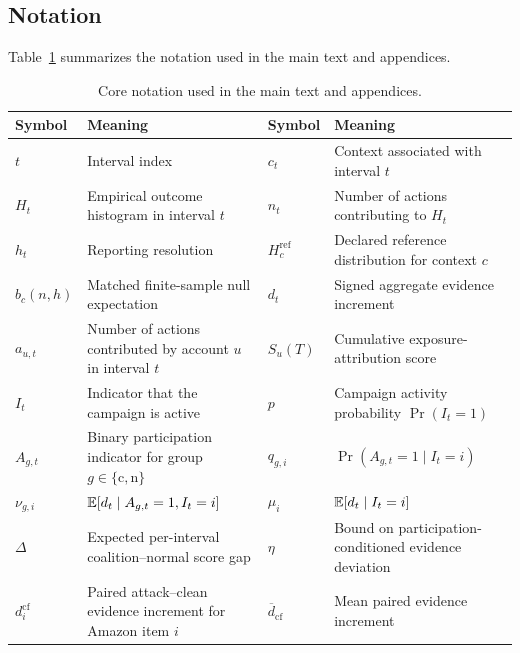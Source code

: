 \subsection{Notation}
\label{sec:supp-notation}

Table~\ref{tab:supp-notation} summarizes the notation used in the main text
and appendices.

\begin{table}[t]
\caption{Core notation used in the main text and appendices.}
\label{tab:supp-notation}
\centering
\small
\setlength{\tabcolsep}{5pt}
\renewcommand{\arraystretch}{1.08}
\begin{tabularx}{\textwidth}{@{}lXlX@{}}
\toprule
\textbf{Symbol} & \textbf{Meaning}
& \textbf{Symbol} & \textbf{Meaning} \\
\midrule

$t$
& Interval index
&
$c_t$
& Context associated with interval $t$
\\

$H_t$
& Empirical outcome histogram in interval $t$
&
$n_t$
& Number of actions contributing to $H_t$
\\

$h_t$
& Reporting resolution
&
$H_c^{\mathrm{ref}}$
& Declared reference distribution for context $c$
\\

$b_c(n,h)$
& Matched finite-sample null expectation
&
$d_t$
& Signed aggregate evidence increment
\\

$a_{u,t}$
& Number of actions contributed by account $u$ in interval $t$
&
$S_u(T)$
& Cumulative exposure-attribution score
\\

$I_t$
& Indicator that the campaign is active
&
$p$
& Campaign activity probability $\Pr(I_t=1)$
\\

$A_{g,t}$
& Binary participation indicator for group $g\in\{\mathrm c,\mathrm n\}$
&
$q_{g,i}$
& $\Pr(A_{g,t}=1\mid I_t=i)$
\\

$\nu_{g,i}$
& $\mathbb{E}[d_t\mid A_{g,t}=1,I_t=i]$
&
$\mu_i$
& $\mathbb{E}[d_t\mid I_t=i]$
\\

$\Delta$
& Expected per-interval coalition--normal score gap
&
$\eta$
& Bound on participation-conditioned evidence deviation
\\

$d_i^{\mathrm{cf}}$
& Paired attack--clean evidence increment for Amazon item $i$
&
$\overline d_{\mathrm{cf}}$
& Mean paired evidence increment
\\


\end{tabularx}
\end{table}
